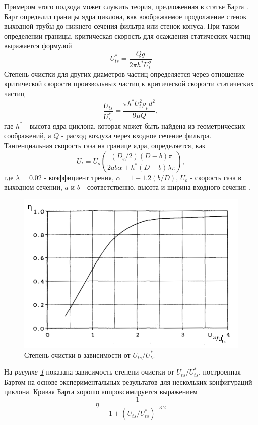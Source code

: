 			Примером этого подхода может служить теория, предложенная в статье Барта \cite{Barth}. Барт определил границы ядра циклона, как воображаемое продолжение стенок выходной трубы до нижнего сечения фильтра или стенок конуса. При таком определении границы, критическая скорость для осаждения статических частиц выражается формулой
			\begin{equation}
				U^{*}_{ts} = \frac{Qg}{2 \pi h^{*} U^2_t}
			\end{equation}
			Степень очистки для других диаметров частиц определяется через отношение критической скорости произвольных частиц к критической скорости статических частиц
			\begin{equation}
				\frac{U_{ts}}{U^{*}_{ts}} = \frac{\pi h^{*}U^2_t\rho_p d^2}{9 \mu Q},
			\end{equation}
			где $h^{*}$ - высота ядра циклона, которая может быть найдена из геометрических соображений, а $Q$ - расход воздуха через входное сечение фильтра. Тангенциальная скорость газа на границе ядра, определяется, как 
			\begin{equation}
				U_t = U_o\left(\frac{(D_e/2)(D-b)\pi}{2ab\alpha + h^{*}(D-b)\lambda \pi}\right),
			\end{equation}
			где $\lambda = 0.02$ - коэффициент трения, $\alpha = 1-1.2(b/D)$, $U_o$ - скорость газа в выходном сечении, $a$ и $b$ - соответственно, высота и ширина входного сечения \cite{Barth}.
			\begin{figure}[ht]
				\centering
				\includegraphics[scale=0.48]{Barth}
				\caption{Степень очистки в зависимости от $U_{ts}/U^{*}_{ts}$}
				\label{fig:barth}
			\end{figure}
			На \textit{рисунке \ref{fig:barth}} показана зависимость степени очистки от $U_{ts}/U^{*}_{ts}$, построенная Бартом на основе экспериментальных результатов для нескольких конфигураций циклона. Кривая Барта хорошо аппроксимируется выражением
			\begin{equation}
				\eta = \frac{1}{1+ (U_{ts}/U^{*}_{ts})^{-3.2}}
			\end{equation}
	
